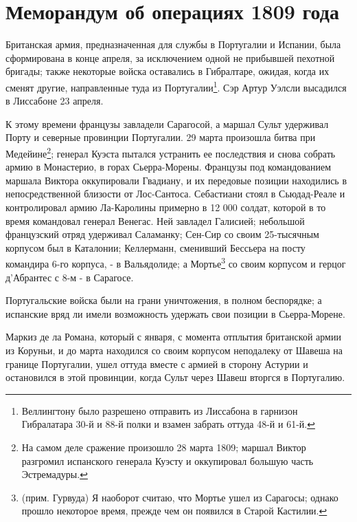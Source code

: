 \documentclass[
  oneside,
  12pt,
  titlepage]{book}
\begin{document}
\hypertarget{ux43cux435ux43cux43eux440ux430ux43dux434ux443ux43c-ux43eux431-ux43eux43fux435ux440ux430ux446ux438ux44fux445-1809-ux433ux43eux434ux430}{%
\chapter{Меморандум об операциях 1809 года}\label{ux43cux435ux43cux43eux440ux430ux43dux434ux443ux43c-ux43eux431-ux43eux43fux435ux440ux430ux446ux438ux44fux445-1809-ux433ux43eux434ux430}}

Британская армия, предназначенная для службы в Португалии и Испании, была сформирована в конце апреля, за исключением одной не прибывшей пехотной бригады; также некоторые войска оставались в Гибралтаре, ожидая, когда их сменят другие, направленные туда из Португалии\footnote{Веллингтону было разрешено отправить из Лиссабона в гарнизон Гибралатара 30-й и 88-й полки и взамен забрать оттуда 48-й и 61-й.}. Сэр Артур Уэлсли высадился в Лиссабоне 23 апреля.

К этому времени французы завладели Сарагосой, а маршал Сульт удерживал Порту и северные провинции Португалии. 29 марта произошла битва при Медейине\footnote{На самом деле сражение произошло 28 марта 1809; маршал Виктор разгромил испанского генерала Куэсту и оккупировал большую часть Эстремадуры.}; генерал Куэста пытался устранить ее последствия и снова собрать армию в Монастерио, в горах Сьерра-Морены. Французы под командованием маршала Виктора оккупировали Гвадиану, и их передовые позиции находились в непосредственной близости от Лос-Сантоса. Себастиани стоял в Сьюдад-Реале и контролировал армию Ла-Каролины примерно в 12 000 солдат, которой в то время командовал генерал Венегас. Ней завладел Галисией; небольшой французский отряд удерживал Саламанку; Сен-Сир со своим 25-тысячным корпусом был в Каталонии; Келлерманн, сменивший Бессьера на посту командира 6-го корпуса, - в Вальядолиде; а Мортье\footnote{(прим. Гурвуда) Я наоборот считаю, что Мортье ушел из Сарагосы; однако прошло некоторое время, прежде чем он появился в Старой Кастилии.} со своим корпусом и герцог д'Абрантес с 8-м - в Сарагосе.

Португальские войска были на грани уничтожения, в полном беспорядке; а испанские вряд ли имели возможность удержать свои позиции в Сьерра-Морене.

Маркиз де ла Романа, который с января, с момента отплытия британской армии из Коруньи, и до марта находился со своим корпусом неподалеку от Шавеша на границе Португалии, ушел оттуда вместе с армией в сторону Астурии и остановился в этой провинции, когда Сульт через Шавеш вторгся в Португалию.
\end{document}

